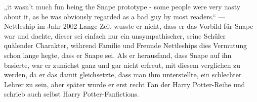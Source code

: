 \documentclass[a4paper, 10pt]{article}
\begin{document}
„it wasn't much fun being the Snape prototype - some people were very nasty about it, as he was obviously regarded as a bad guy by most readers.“
— Nettleship im Jahr 2002
\vspace{10pt}
\newline
{}  
Lange Zeit wusste er nicht, dass er das Vorbild für Snape war und dachte, dieser sei einfach nur ein unsympathischer, seine Schüler quälender Charakter, während Familie und Freunde Nettleships dies Vermutung schon lange hegte, dass er Snape sei. Als er herausfand, dass Snape auf ihn basierte, war er zunächst ganz und gar nicht erfreut, mit diesem verglichen zu werden, da er das damit gleichsetzte, dass man ihm unterstellte, ein schlechter Lehrer zu sein, aber später wurde er erst recht Fan der Harry Potter-Reihe und schrieb auch selbst Harry Potter-Fanfictions.
\end{document}
